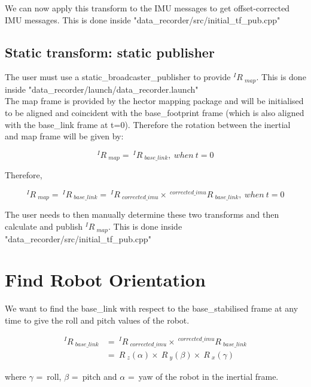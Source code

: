 \documentclass{article}
\begin{document}
We can now apply this transform to the IMU messages to get offset-corrected IMU messages. This is done inside "data\_recorder/src/initial\_tf\_pub.cpp"


\subsection{Static transform: static publisher}
The user must use a static\_broadcaster\_publisher to provide $ {^{I}R\ _{map}}$. This is done inside "data\_recorder/launch/data\_recorder.launch" \\

The map frame is provided by the hector mapping package and will be initialised to be aligned and coincident with the base\_footprint frame (which is also aligned with the base\_link frame at t=0). Therefore the rotation between the inertial and map frame will be given by:

\begin{equation}
^{I}R\ _{map}=\ ^{I}R\ _{base\_link},\ when\ t=0
\end{equation}

Therefore,

\begin{equation}
^{I}R\ _{map}=\ ^{I}R\ _{base\_link}=\ ^{I}R\ _{corrected\_imu} \times\ ^{corrected\_imu}R\ _{base\_link},\ when\ t=0
\end{equation}

The user needs to then manually determine these two transforms and then calculate and publish $^{I}R\ _{map}$. This is done inside "data\_recorder/src/initial\_tf\_pub.cpp"



\section{Find Robot Orientation}
We want to find the base\_link with respect to the base\_stabilised frame at any time to give the roll and pitch values of the robot.

\begin{align}
^{I}R\ _{base\_link} & =\ ^{I}R\ _{corrected\_imu} \times\  ^{corrected\_imu}R\ _{base\_link}\\
 & =\ R\ _z(\alpha) \times\  R\ _y(\beta) \times\  R\ _x(\gamma) 
\end{align}

where $\gamma$ =\ roll, $\beta$ =\ pitch and $\alpha$ =\ yaw of the robot in the inertial frame.\\
\end{document}
